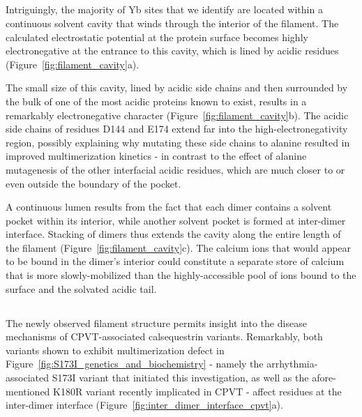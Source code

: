 \subsection{\headingsubsectionsix}

Intriguingly, the majority of Yb sites that we identify are located within a continuous solvent cavity that winds through the interior of the filament. The calculated electrostatic potential at the protein surface becomes highly electronegative at the entrance to this cavity, which is lined by acidic residues (Figure~\ref{fig:filament_cavity}a). 
\begin{hlbreakable} 
The small size of this cavity, lined by acidic side chains and then surrounded by the bulk of one of the most acidic proteins known to exist, results in a remarkably electronegative character (Figure~\ref{fig:filament_cavity}b). The acidic side chains of residues D144 and E174 extend far into the high-electronegativity region, possibly explaining why mutating these side chains to alanine resulted in improved multimerization kinetics - in contrast to the effect of alanine mutagenesis of the other interfacial acidic residues, which are much closer to or even outside the boundary of the pocket. \end{hlbreakable} 
A continuous lumen results from the fact that each dimer contains a solvent pocket within its interior, while another solvent pocket is formed at inter-dimer interface. Stacking of dimers thus extends the cavity along the entire length of the filament (Figure~\ref{fig:filament_cavity}c). The calcium ions that would appear to be bound in the dimer's interior could constitute a separate store of calcium that is more slowly-mobilized than the highly-accessible pool of ions bound to the surface and the solvated acidic tail. 

\subsection{\headingsubsectionseven}

The newly observed filament structure permits insight into the disease mechanisms of CPVT-associated calsequestrin variants. Remarkably, both variants shown to exhibit multimerization defect in Figure~\ref{fig:S173I_genetics_and_biochemistry} - namely the arrhythmia-associated S173I variant that initiated this investigation, as well as the afore-mentioned K180R variant recently implicated in CPVT \cite{Gray2016-kx} - affect residues at the inter-dimer interface (Figure~\ref{fig:inter_dimer_interface_cpvt}a). 

